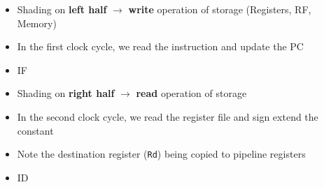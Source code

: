 \begin{frame}[fragile]

 
  \begin{itemize}

\item Shading on \textbf{left half}  $\rightarrow$ \textbf{write} operation of storage (Registers, RF, Memory) 
  \item In the first clock cycle, we read the instruction and    update the PC
  \end{itemize}
\BNotes\ifnum{}
\begin{itemize}
  \item IF
\end{itemize}
\fi\ENotes
\end{frame}

\begin{frame}[fragile]
  \begin{itemize}

\item  Shading on \textbf{right half} $\rightarrow$ \textbf{read} operation of storage 
  \item In the second clock cycle, we read the register file and
    sign extend the constant
    \item Note the destination register ({\tt Rd}) being copied to pipeline registers
  \end{itemize}
\BNotes\ifnum{}
\begin{itemize}
  \item ID
\end{itemize}
\fi\ENotes
\end{frame}

